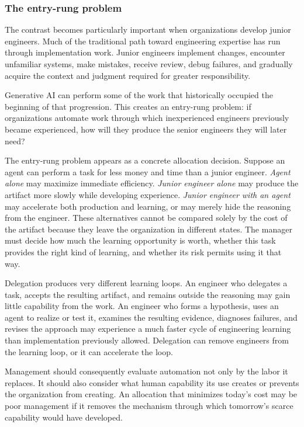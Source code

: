 \subsubsection{The entry-rung problem}\label{sec-entry-rung}

The contrast becomes particularly important when organizations develop junior engineers. Much of
the traditional path toward engineering expertise has run through implementation work. Junior
engineers implement changes, encounter unfamiliar systems, make mistakes, receive review, debug
failures, and gradually acquire the context and judgment required for greater responsibility.

Generative AI can perform some of the work that historically occupied the beginning of that
progression. This creates an entry-rung problem: if organizations automate work through which
inexperienced engineers previously became experienced, how will they produce the senior engineers
they will later need?

The entry-rung problem appears as a concrete allocation decision. Suppose an agent can perform a
task for less money and time than a junior engineer. \emph{Agent alone} may maximize immediate
efficiency. \emph{Junior engineer alone} may produce the artifact more slowly while developing
experience. \emph{Junior engineer with an agent} may accelerate both production and learning, or may
merely hide the reasoning from the engineer. These alternatives cannot be compared solely by the
cost of the artifact because they leave the organization in different states. The manager must
decide how much the learning opportunity is worth, whether this task provides the right kind of
learning, and whether its risk permits using it that way.

Delegation produces very different learning loops. An engineer who delegates a task, accepts the
resulting artifact, and remains outside the reasoning may gain little capability from the work. An
engineer who forms a hypothesis, uses an agent to realize or test it, examines the resulting
evidence, diagnoses failures, and revises the approach may experience a much faster cycle of
engineering learning than implementation previously allowed. Delegation can remove engineers from
the learning loop, or it can accelerate the loop.

Management should consequently evaluate automation not only by the labor it replaces. It should
also consider what human capability its use creates or prevents the organization from creating. An
allocation that minimizes today's cost may be poor management if it removes the mechanism through
which tomorrow's scarce capability would have developed.

